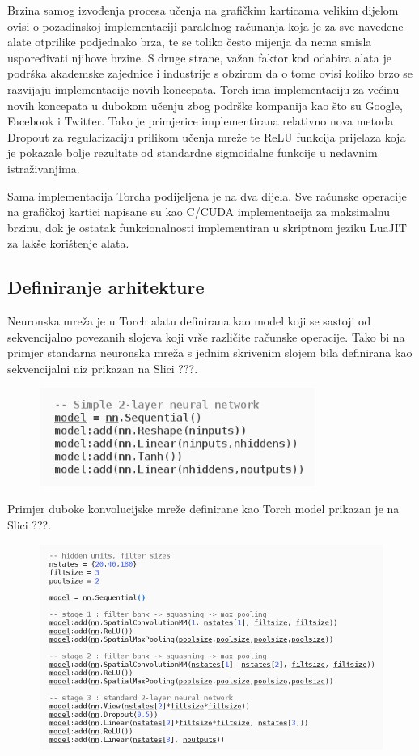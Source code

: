 \documentclass[lmodern, utf8, diplomski, numeric]{fer}
\begin{document}
Brzina samog izvođenja procesa učenja na grafičkim karticama velikim dijelom ovisi o pozadinskoj implementaciji paralelnog računanja koja je za sve navedene alate otprilike podjednako brza, te se toliko često mijenja da nema smisla uspoređivati njihove brzine. S druge strane, važan faktor kod odabira alata je podrška akademske zajednice i industrije s obzirom da o tome ovisi koliko brzo se razvijaju implementacije novih koncepata. Torch ima implementaciju za većinu novih koncepata u dubokom učenju zbog podrške kompanija kao što su Google, Facebook i Twitter.  Tako je primjerice implementirana relativno nova metoda Dropout za regularizaciju prilikom učenja mreže te ReLU funkcija prijelaza koja je pokazale bolje rezultate od standardne sigmoidalne funkcije u nedavnim istraživanjima.

Sama implementacija Torcha podijeljena je na dva dijela. Sve računske operacije na grafičkoj kartici napisane su kao C/CUDA implementacija za maksimalnu brzinu, dok je ostatak funkcionalnosti implementiran u skriptnom jeziku LuaJIT za lakše korištenje alata.  

\subsection{Definiranje arhitekture}
	
Neuronska mreža je u Torch alatu definirana kao model koji se sastoji od sekvencijalno povezanih slojeva koji vrše različite računske operacije.
Tako bi na primjer standarna neuronska mreža s jednim skrivenim slojem bila definirana kao sekvencijalni niz prikazan na Slici ???. 

\begin{figure}[ht!]
\centering
\includegraphics[width=9cm]{slike/nn_model.png}
\caption{}
\end{figure}

Primjer duboke konvolucijske mreže definirane kao Torch model prikazan je na Slici ???.

\begin{figure}[ht!]
\centering
\includegraphics[width=16cm]{slike/cnn_model.png}
\caption{}
\end{figure}
\end{document}
